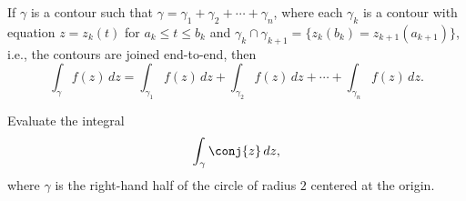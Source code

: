 \begin{theorem}
    If \(\gamma\) is a contour such that \(\gamma = \gamma_1 + \gamma_2 + \cdots + \gamma_n\), where each \(\gamma_k\) is a contour with equation \(z = z_k(t)\) for \(a_k \leq t \leq b_k\) and \(\gamma_k \cap \gamma_{k+1} = \{z_k(b_k) = z_{k+1}(a_{k+1})\}\), i.e., the contours are joined end-to-end, then
    \[
        \int_\gamma f(z) \, dz = \int_{\gamma_1} f(z) \, dz + \int_{\gamma_2} f(z) \, dz + \cdots + \int_{\gamma_n} f(z) \, dz.
    \]
\end{theorem}

\begin{example}
    Evaluate the integral
    \[
        \int_{\gamma} \conj{z} \, dz,
    \]
    where \(\gamma\) is the right-hand half of the circle of radius \(2\) centered at the origin.
\end{example}